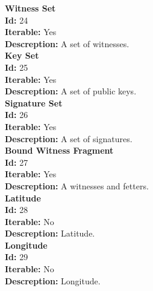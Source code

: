 \documentclass[11pt]{article}
\begin{document}
\noindent
\textbf{Witness Set} \\
\indent \textbf{Id:} 24 \\
\indent \textbf{Iterable:} Yes \\
\indent \textbf{Descreption:} A set of witnesses. \\

\noindent
\textbf{Key Set} \\
\indent \textbf{Id:} 25 \\
\indent \textbf{Iterable:} Yes \\
\indent \textbf{Descreption:} A set of public keys. \\

\noindent
\textbf{Signature Set} \\
\indent \textbf{Id:} 26 \\
\indent \textbf{Iterable:} Yes \\
\indent \textbf{Descreption:} A set of signatures. \\

\noindent
\textbf{Bound Witness Fragment} \\
\indent \textbf{Id:} 27 \\
\indent \textbf{Iterable:} Yes \\
\indent \textbf{Descreption:} A witnesses and fetters. \\

\noindent
\textbf{Latitude} \\
\indent \textbf{Id:} 28 \\
\indent \textbf{Iterable:} No \\
\indent \textbf{Descreption:} Latitude. \\

\noindent
\textbf{Longitude} \\
\indent \textbf{Id:} 29 \\
\indent \textbf{Iterable:} No \\
\indent \textbf{Descreption:} Longitude. \\
\end{document}
